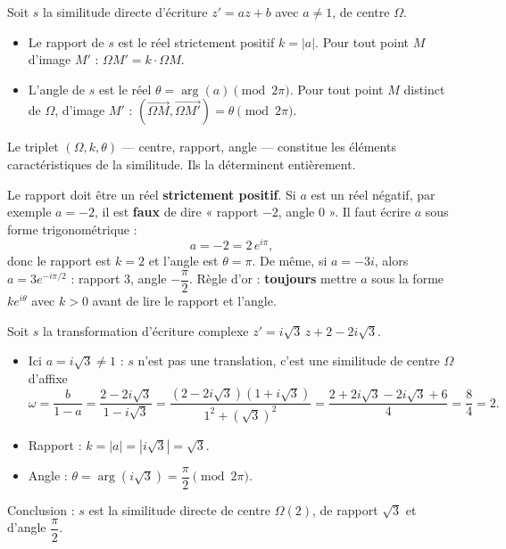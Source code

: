 \documentclass[11pt]{article}
\newcommand{\cle}[1]{{\popxbold\color{popdark}#1}}
\begin{document}
\begin{definition}
Soit $s$ la similitude directe d'écriture $z' = az + b$ avec $a \neq 1$, de centre $\Omega$.
\begin{itemize}
\item Le \cle{rapport} de $s$ est le réel strictement positif $k = |a|$. Pour tout point $M$ d'image $M'$ : $\Omega M' = k \cdot \Omega M$.
\item L'\cle{angle} de $s$ est le réel $\theta = \arg(a) \pmod{2\pi}$. Pour tout point $M$ distinct de $\Omega$, d'image $M'$ : $\left(\overrightarrow{\Omega M}, \overrightarrow{\Omega M'}\right) = \theta \pmod{2\pi}$.
\end{itemize}
Le triplet $(\Omega, k, \theta)$ — centre, rapport, angle — constitue les \cle{éléments caractéristiques} de la similitude. Ils la déterminent entièrement.
\end{definition}

\begin{attention}
Le rapport doit être un réel \textbf{strictement positif}. Si $a$ est un réel négatif, par exemple $a = -2$, il est \textbf{faux} de dire « rapport $-2$, angle $0$ ». Il faut écrire $a$ sous forme trigonométrique :
\[ a = -2 = 2\,e^{i\pi}, \]
donc le rapport est $k = 2$ et l'angle est $\theta = \pi$. De même, si $a = -3i$, alors $a = 3e^{-i\pi/2}$ : rapport $3$, angle $-\dfrac{\pi}{2}$. Règle d'or : \textbf{toujours} mettre $a$ sous la forme $k e^{i\theta}$ avec $k > 0$ avant de lire le rapport et l'angle.
\end{attention}

\begin{exemplebox}
Soit $s$ la transformation d'écriture complexe $z' = i\sqrt{3}\,z + 2 - 2i\sqrt{3}$.
\begin{itemize}
\item Ici $a = i\sqrt{3} \neq 1$ : $s$ n'est pas une translation, c'est une similitude de centre $\Omega$ d'affixe
\[ \omega = \frac{b}{1 - a} = \frac{2 - 2i\sqrt{3}}{1 - i\sqrt{3}} = \frac{(2 - 2i\sqrt{3})(1 + i\sqrt{3})}{1^2 + (\sqrt{3})^2} = \frac{2 + 2i\sqrt{3} - 2i\sqrt{3} + 6}{4} = \frac{8}{4} = 2. \]
\item Rapport : $k = |a| = |i\sqrt{3}| = \sqrt{3}$.
\item Angle : $\theta = \arg(i\sqrt{3}) = \dfrac{\pi}{2} \pmod{2\pi}$.
\end{itemize}
Conclusion : $s$ est la similitude directe de centre $\Omega(2)$, de rapport $\sqrt{3}$ et d'angle $\dfrac{\pi}{2}$.
\end{exemplebox}
\end{document}
